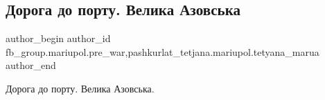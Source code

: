  
 
 
 
 

\subsection{Дорога до порту. Велика Азовська}
\label{sec:12_02_2023.fb.fb_group.mariupol.pre_war.10.doroga_do_portu__vel}
 
\ifcmt
 author_begin
   author_id fb_group.mariupol.pre_war,pashkurlat_tetjana.mariupol.tetyana_marua
 author_end
\fi

Дорога до порту. Велика Азовська. 💙💛
